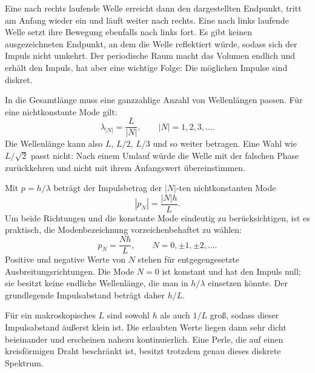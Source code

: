 Eine nach rechts laufende Welle erreicht dann den dargestellten Endpunkt, tritt am Anfang wieder ein und läuft weiter nach rechts. Eine nach links laufende Welle setzt ihre Bewegung ebenfalls nach links fort. Es gibt keinen ausgezeichneten Endpunkt, an dem die Welle reflektiert würde, sodass sich der Impuls nicht umkehrt. Der periodische Raum macht das Volumen endlich und erhält den Impuls, hat aber eine wichtige Folge: Die möglichen Impulse sind diskret.

In die Gesamtlänge muss eine ganzzahlige Anzahl von Wellenlängen passen. Für eine nichtkonstante Mode gilt:
\begin{equation}
\lambda_{|N|}=\frac{L}{|N|},
\qquad |N|=1,2,3,\ldots .
\end{equation}
Die Wellenlänge kann also \(L\), \(L/2\), \(L/3\) und so weiter betragen. Eine Wahl wie \(L/\sqrt{2}\) passt nicht: Nach einem Umlauf würde die Welle mit der falschen Phase zurückkehren und nicht mit ihrem Anfangswert übereinstimmen.

Mit \(p=h/\lambda\) beträgt der Impulsbetrag der \(|N|\)-ten nichtkonstanten Mode
\begin{equation}
|p_N|=\frac{|N|h}{L}.
\end{equation}
Um beide Richtungen und die konstante Mode eindeutig zu berücksichtigen, ist es praktisch, die Modenbezeichnung vorzeichenbehaftet zu wählen:
\begin{equation}
p_N=\frac{Nh}{L},
\qquad N=0,\pm1,\pm2,\ldots .
\end{equation}
Positive und negative Werte von \(N\) stehen für entgegengesetzte Ausbreitungsrichtungen. Die Mode \(N=0\) ist konstant und hat den Impuls null; sie besitzt keine endliche Wellenlänge, die man in \(h/\lambda\) einsetzen könnte. Der grundlegende Impulsabstand beträgt daher \(h/L\).

Für ein makroskopisches \(L\) sind sowohl \(h\) als auch \(1/L\) groß, sodass dieser Impulsabstand äußerst klein ist. Die erlaubten Werte liegen dann sehr dicht beieinander und erscheinen nahezu kontinuierlich. Eine Perle, die auf einen kreisförmigen Draht beschränkt ist, besitzt trotzdem genau dieses diskrete Spektrum.

\begin{classroomqa}\end{classroomqa}

